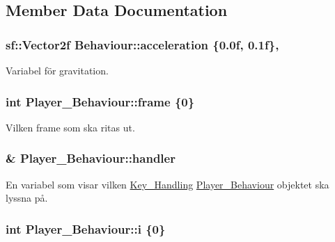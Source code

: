 \subsection{Member Data Documentation}
\hypertarget{classBehaviour_ac17cf81ceee6a44e8a8ec6ee810c9fd3}{
\subsubsection[{acceleration}]{\setlength{\rightskip}{0pt plus 5cm}sf\+::\+Vector2f Behaviour\+::acceleration \{0.\+0f, 0.\+1f\}\hspace{0.3cm}{\ttfamily [protected]}, {\ttfamily [inherited]}}}\label{classBehaviour_ac17cf81ceee6a44e8a8ec6ee810c9fd3}


Variabel för gravitation. 

\hypertarget{classPlayer__Behaviour_af51ca380d3847dfeee6636abf7f5a6a9}{
\subsubsection[{frame}]{\setlength{\rightskip}{0pt plus 5cm}int Player\+\_\+\+Behaviour\+::frame \{0\}\hspace{0.3cm}{\ttfamily [private]}}}\label{classPlayer__Behaviour_af51ca380d3847dfeee6636abf7f5a6a9}


Vilken frame som ska ritas ut. 

\hypertarget{classPlayer__Behaviour_a14e943931e401609e8182340b4a7273c}{
\subsubsection[{handler}]{\& Player\+\_\+\+Behaviour\+::handler\hspace{0.3cm}{\ttfamily [private]}}}\label{classPlayer__Behaviour_a14e943931e401609e8182340b4a7273c}
En variabel som visar vilken \hyperlink{classKey__Handling}{Key\+\_\+\+Handling} \hyperlink{classPlayer__Behaviour}{Player\+\_\+\+Behaviour} objektet ska lyssna på. \hypertarget{classPlayer__Behaviour_a349e59d8a094c3f5b7263471135686bc}{
\subsubsection[{i}]{\setlength{\rightskip}{0pt plus 5cm}int Player\+\_\+\+Behaviour\+::i \{0\}\hspace{0.3cm}{\ttfamily [private]}}}\label{classPlayer__Behaviour_a349e59d8a094c3f5b7263471135686bc}


